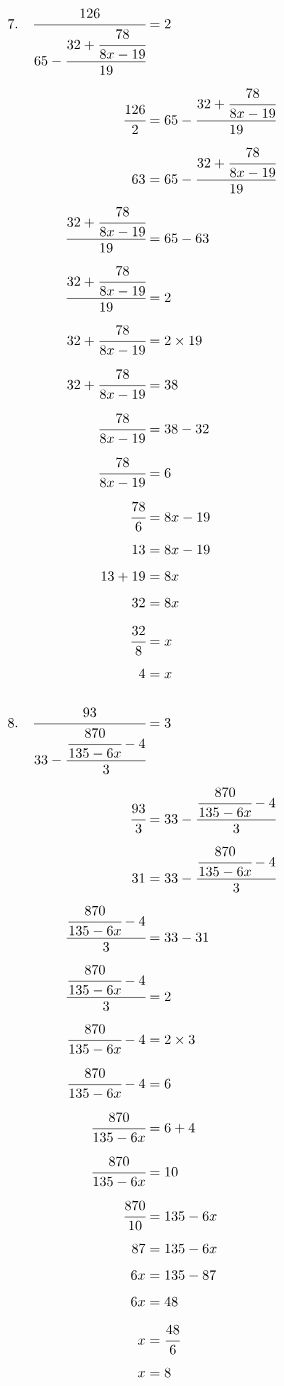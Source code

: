 \documentclass{article}
\begin{document}
\noindent
\begin{minipage}[t]{0.5000\textwidth}
\begin{align*}
7.\hspace{10pt}\cfrac{126}{65-\cfrac{32+\cfrac{78}{8x-19}}{19}}&=2\\[4pt]
\cfrac{126}{2}&=65-\cfrac{32+\cfrac{78}{8x-19}}{19}\\[4pt]
63&=65-\cfrac{32+\cfrac{78}{8x-19}}{19}\\[4pt]
\cfrac{32+\cfrac{78}{8x-19}}{19}&=65-63\\[4pt]
\cfrac{32+\cfrac{78}{8x-19}}{19}&=2\\[4pt]
32+\cfrac{78}{8x-19}&=2\times19\\[4pt]
32+\cfrac{78}{8x-19}&=38\\[4pt]
\cfrac{78}{8x-19}&=38-32\\[4pt]
\cfrac{78}{8x-19}&=6\\[4pt]
\cfrac{78}{6}&=8x-19\\[4pt]
13&=8x-19\\[4pt]
13+19&=8x\\[4pt]
32&=8x\\[4pt]
\cfrac{32}{8}&=x\\[4pt]
4&=x\\[4pt]
\end{align*}
\end{minipage}
\begin{minipage}[t]{0.5000\textwidth}
\begin{align*}
8.\hspace{10pt}\cfrac{93}{33-\cfrac{\cfrac{870}{135-6x}-4}{3}}&=3\\[4pt]
\cfrac{93}{3}&=33-\cfrac{\cfrac{870}{135-6x}-4}{3}\\[4pt]
31&=33-\cfrac{\cfrac{870}{135-6x}-4}{3}\\[4pt]
\cfrac{\cfrac{870}{135-6x}-4}{3}&=33-31\\[4pt]
\cfrac{\cfrac{870}{135-6x}-4}{3}&=2\\[4pt]
\cfrac{870}{135-6x}-4&=2\times3\\[4pt]
\cfrac{870}{135-6x}-4&=6\\[4pt]
\cfrac{870}{135-6x}&=6+4\\[4pt]
\cfrac{870}{135-6x}&=10\\[4pt]
\cfrac{870}{10}&=135-6x\\[4pt]
87&=135-6x\\[4pt]
6x&=135-87\\[4pt]
6x&=48\\[4pt]
x&=\cfrac{48}{6}\\[4pt]
x&=8\\[4pt]
\end{align*}
\end{minipage}
\vspace{10 mm}
\end{document}
